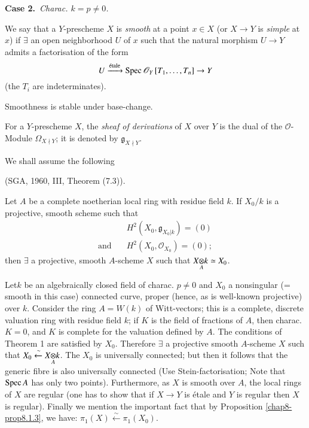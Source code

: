 \medskip
\noindent
{\bf Case 2.}~{\em Charac. $k=p\neq 0$.}\pageoriginale 
\smallskip

\begin{defi*}
We say that a $Y$-prescheme $X$ is {\em smooth} at a point $x\in X$
(or $X\to Y$ is {\em simple} at $x$) if $\exists$ an open neighborhood
$U$ of $x$ such that the natural morphism $U\to Y$ admits a
factorisation of the form
$$
U\xrightarrow{\text{\'etale}}\operatorname{Spec} \mathscr{O}_{Y}\left[T_{1},\ldots,T_{n}\right]\to Y
$$
(the $T_{i}$ are indeterminates).
\end{defi*}

\begin{note*}
Smoothness is stable under base-change.
\end{note*}

\begin{defi*}
For a $Y$-prescheme $X$, the {\em sheaf of derivations} of $X$ over
$Y$ is the dual of the $\mathscr{O}$-Module $\Omega_{X\nmid Y}$; it is
denoted by $\mathfrak{g}_{X\nmid Y}$.
\end{defi*}

We shall assume the following

\begin{thm}
(SGA, 1960, III, Theorem (7.3)).
\end{thm}

Let $A$ be a complete noetherian local ring with residue field $k$. If
$X_{0}/k$ is a projective, smooth scheme such that
\begin{align*}
 & H^{2}(X_{0},\mathfrak{g}_{X_{0}|k})=(0)\\
\text{and}\quad & H^{2}(X_{0},\mathscr{O}_{X_{0}})=(0);
\end{align*}
then $\exists$ a projective, smooth $A$-scheme $X$ such that
$\foprod{X}{k}{A}\simeq X_{0}$. 

Let\pageoriginale $k$ be an algebraically closed field of
charac. $p\neq 0$ and $X_{0}$ a nonsingular (= smooth in this case)
connected curve, proper (hence, as is well-known projective) over
$k$. Consider the ring $A=W(k)$ of Witt-vectors; this is a complete,
discrete valuation ring with residue field $k$; if $K$ is the field of
fractions of $A$, then charac. $K=0$, and $K$ is complete for the
valuation defined by $A$. The conditions of Theorem 1 are satisfied by
$X_{0}$. Therefore $\exists$ a projective smooth $A$-scheme $X$ such
that $X_{0}\xleftarrow{\sim}\foprod{X}{k}{A}$. The $X_{0}$ is
universally connected; but then it follows that the generic fibre is
also universally connected (Use Stein-factorisation; Note that
$\operatorname{Spec} A$ has only two points). Furthermore, as $X$ is smooth over
$A$, the local rings of $X$ are regular (one has to show that if $X\to
Y$ is \'etale and $Y$ is regular then $X$ is regular). Finally we
mention the important fact that by Proposition \ref{chap8-prop8.1.3}, we
have: $\pi_{1}(X)\xleftarrow{\sim}\pi_{1}(X_{0})$. 

